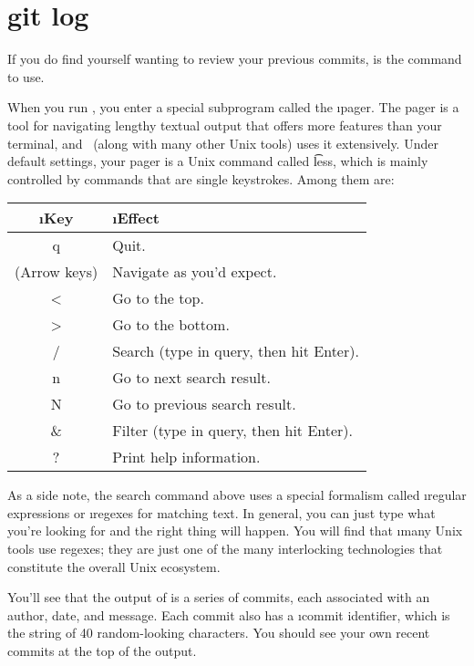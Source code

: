 \documentclass[letterpaper,12pt,titlepage,twoside]{article}
\begin{document}
\section{git log}

If you do find yourself wanting to review your previous commits, 
is the command to use.


When you run , you enter a special subprogram called the \i{pager}.
The pager is a tool for navigating lengthy textual output that offers more
features than your terminal, and \git\ (along with many other Unix tools) uses
it extensively. Under default settings, your pager is a Unix command called
\t{less}, which is mainly controlled by commands that are single keystrokes.
Among them are:

\begin{center}
\begin{tabular}{>{\ttfamily}cl}
\rmfamily\i{Key} & \i{Effect} \\ \hline
q & Quit. \\
\rmfamily(Arrow keys) & Navigate as you'd expect. \\
< & Go to the top. \\
> & Go to the bottom. \\
/ & Search (type in query, then hit Enter). \\
n & Go to next search result. \\
N & Go to previous search result. \\
\& & Filter (type in query, then hit Enter). \\
? & Print help information.
\end{tabular}
\end{center}

As a side note, the search command above uses a special formalism called
\i{regular expressions} or \i{regexes} for matching text. In general, you can
just type what you're looking for and the right thing will happen. You will
find that \i{many} Unix tools use regexes; they are just one of the many
interlocking technologies that constitute the overall Unix ecosystem.

You'll see that the output of  is a series of commits, each
associated with an author, date, and message. Each commit also has a \i{commit
  identifier}, which is the string of 40 random-looking characters. You should
see your own recent commits at the top of the output.

\end{document}
